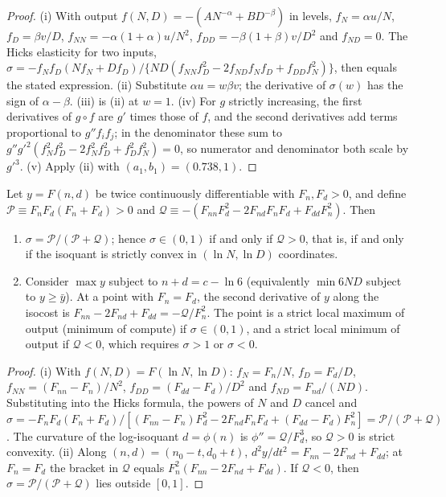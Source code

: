 \begin{proof}
(i) With output $f(N,D)=-(AN^{-\alpha}+BD^{-\beta})$ in levels, $f_N=\alpha u/N$, $f_D=\beta v/D$,
$f_{NN}=-\alpha(1+\alpha)u/N^2$, $f_{DD}=-\beta(1+\beta)v/D^2$ and $f_{ND}=0$. The Hicks elasticity for two inputs,
$\sigma=-f_Nf_D(Nf_N+Df_D)/\{ND(f_{NN}f_D^2-2f_{ND}f_Nf_D+f_{DD}f_N^2)\}$, then equals the stated expression.
(ii) Substitute $\alpha u=w\beta v$; the derivative of $\sigma(w)$ has the sign of $\alpha-\beta$. (iii) is (ii) at
$w=1$. (iv) For $g$ strictly increasing, the first derivatives of $g\circ f$ are $g'$ times those of $f$, and the second
derivatives add terms proportional to $g''f_if_j$; in the denominator these sum to
$g''g'^2(f_N^2f_D^2-2f_N^2f_D^2+f_D^2f_N^2)=0$, so numerator and denominator both scale by $g'^3$. (v) Apply (ii) with
$(a_1,b_1)=(0.738,1)$.
\end{proof}

\begin{lemma}\label{lem:soc}
Let $y=F(n,d)$ be twice continuously differentiable with $F_n,F_d>0$, and define $\mathcal P\equiv F_nF_d(F_n+F_d)>0$
and $\mathcal Q\equiv-(F_{nn}F_d^2-2F_{nd}F_nF_d+F_{dd}F_n^2)$. Then
\begin{enumerate}
\item[(i)] $\sigma=\mathcal P/(\mathcal P+\mathcal Q)$; hence $\sigma\in(0,1)$ if and only if $\mathcal Q>0$, that is, if and only if the isoquant is
strictly convex in $(\ln N,\ln D)$ coordinates.
\item[(ii)] Consider $\max y$ subject to $n+d=c-\ln6$ (equivalently $\min 6ND$ subject to $y\ge\bar y$). At a point with
$F_n=F_d$, the second derivative of $y$ along the isocost is $F_{nn}-2F_{nd}+F_{dd}=-\mathcal Q/F_n^2$. The point is a strict
local maximum of output (minimum of compute) if $\sigma\in(0,1)$, and a strict local minimum of output if $\mathcal Q<0$, which
requires $\sigma>1$ or $\sigma<0$.
\end{enumerate}
\end{lemma}

\begin{proof}
(i) With $f(N,D)=F(\ln N,\ln D)$: $f_N=F_n/N$, $f_D=F_d/D$, $f_{NN}=(F_{nn}-F_n)/N^2$, $f_{DD}=(F_{dd}-F_d)/D^2$ and
$f_{ND}=F_{nd}/(ND)$. Substituting into the Hicks formula, the powers of $N$ and $D$ cancel and
$\sigma=-F_nF_d(F_n+F_d)/[(F_{nn}-F_n)F_d^2-2F_{nd}F_nF_d+(F_{dd}-F_d)F_n^2]=\mathcal P/(\mathcal P+\mathcal Q)$. The
curvature of the log-isoquant $d=\phi(n)$ is $\phi''=\mathcal Q/F_d^3$, so $\mathcal Q>0$ is strict convexity. (ii) Along $(n,d)=(n_0-t,d_0+t)$,
$d^2y/dt^2=F_{nn}-2F_{nd}+F_{dd}$; at $F_n=F_d$ the bracket in $\mathcal Q$ equals $F_n^2(F_{nn}-2F_{nd}+F_{dd})$. If $\mathcal Q<0$,
then $\sigma=\mathcal P/(\mathcal P+\mathcal Q)$ lies outside $[0,1]$.
\end{proof}

